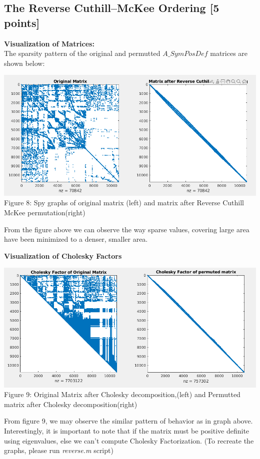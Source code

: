 \documentclass[unicode,11pt,a4paper,oneside,numbers=endperiod,openany]{scrartcl}
\begin{document}
\subsection{The Reverse Cuthill--McKee Ordering [5 points]}

{\textbf{Visualization of Matrices:}\\
The sparsity pattern of the original and permutted $A\_SymPosDef$ matrices are shown below:} \\

 \begin{center}
  \includegraphics[width=0.5\linewidth]{./images/q5original.png}\\
  \label{fig:PageRank of nodes in the tiny web}
  {Figure 8: Spy graphs of original matrix (left) and matrix after Reverse Cuthill McKee permutation(right)}
 \end{center}
 
 {From the figure above we can observe the way sparse values, covering large area have been minimized to a denser, smaller area.}\\
 \newpage
 
 {\textbf{Visualization of Cholesky Factors}}
 
  \begin{center}
  \includegraphics[width=0.5\linewidth]{./images/q5cholesky.png}\\
  \label{fig:PageRank of nodes in the tiny web}
  {Figure 9: Original Matrix after Cholesky decomposition,(left) and Permutted matrix after Cholesky decomposition(right)}\\
 \end{center}
 
  {From figure 9, we may observe the similar pattern of behavior as in graph above. Interestingly, it is important to note that if the matrix must be positive definite using eigenvalues, else we can't compute Cholesky Factorization. (To recreate the graphs, please run \textit{reverse.m} script)}
\end{document}
